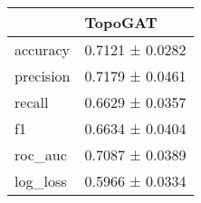 \begin{tabular}{ll}
\toprule
 & TopoGAT \\
\midrule
accuracy & 0.7121 ± 0.0282 \\
precision & 0.7179 ± 0.0461 \\
recall & 0.6629 ± 0.0357 \\
f1 & 0.6634 ± 0.0404 \\
roc_auc & 0.7087 ± 0.0389 \\
log_loss & 0.5966 ± 0.0334 \\
\bottomrule
\end{tabular}
